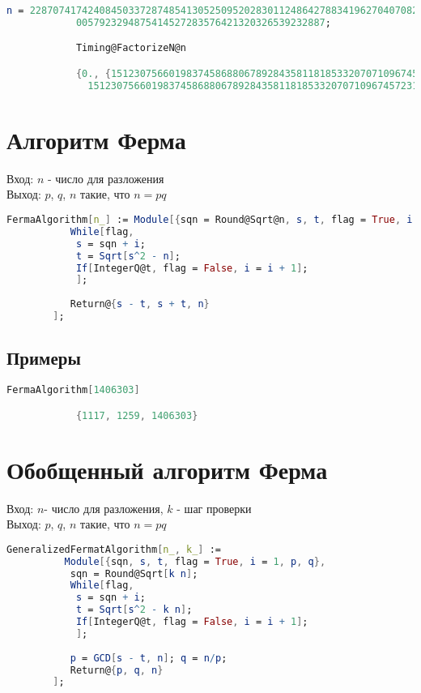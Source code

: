 	    	\begin{lstlisting}[language=Mathematica,caption={
	      		Пример 2
	    	}]
			n = 22870741742408450337287485413052509520283011248642788341962704070824058377\
			0057923294875414527283576421320326539232887;

			Timing@FactorizeN@n

			{0., {15123075660198374586880678928435811818533207071096745723349, 
			  15123075660198374586880678928435811818533207071096745723163}}
	    	\end{lstlisting}

	\section{Алгоритм Ферма}
		Вход: $n$ - число для разложения \\
		Выход: $p$, $q$, $n$ такие, что $n = p q$

		\begin{lstlisting}[language=Mathematica,caption={
      		Алгоритм Ферма	
    	}]
		FermaAlgorithm[n_] := Module[{sqn = Round@Sqrt@n, s, t, flag = True, i = 1},
		   While[flag,
		    s = sqn + i;
		    t = Sqrt[s^2 - n];
		    If[IntegerQ@t, flag = False, i = i + 1];
		    ];
		   
		   Return@{s - t, s + t, n}
		];
    	\end{lstlisting}

    	\subsection{Примеры}

	    	\begin{lstlisting}[language=Mathematica,caption={
	      		Пример 1
	    	}]
			FermaAlgorithm[1406303]

			{1117, 1259, 1406303}
	    	\end{lstlisting}

	\section{Обобщенный алгоритм Ферма}
		Вход: $n $- число для разложения, $k$ - шаг проверки \\
		Выход: $p$, $q$, $n$ такие, что $n = p q$

		\begin{lstlisting}[language=Mathematica,caption={
      		Обобщенный алгоритм Ферма	
    	}]
		GeneralizedFermatAlgorithm[n_, k_] := 
		  Module[{sqn, s, t, flag = True, i = 1, p, q},
		   sqn = Round@Sqrt[k n];
		   While[flag,
		    s = sqn + i;
		    t = Sqrt[s^2 - k n];
		    If[IntegerQ@t, flag = False, i = i + 1];
		    ];
		   
		   p = GCD[s - t, n]; q = n/p;
		   Return@{p, q, n}
		];
    	\end{lstlisting}

